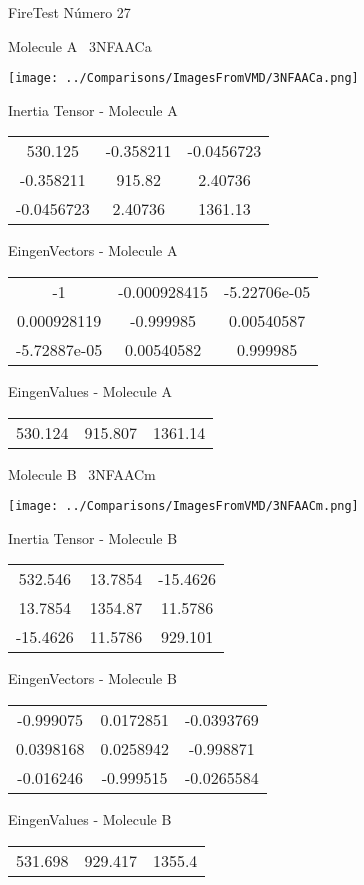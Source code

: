 \vtab[-3cm]
\begin{center}
{\large FireTest \tab Número 27}
\end{center}
\begin{multicols}{2}
\begin{center}

Molecule A \
3NFAACa

\texttt{[image: ../Comparisons/ImagesFromVMD/3NFAACa.png]}

Inertia Tensor - Molecule A \\
\begin{tabular}{|c c c|}
530.125	 & 	-0.358211	 & 	-0.0456723	 \\
-0.358211	 & 	915.82	 & 	2.40736	 \\
-0.0456723	 & 	2.40736	 & 	1361.13
\end{tabular}

\vtab
 EingenVectors - Molecule A     \\
\begin{tabular}{|c c c|}
-1	 & 	-0.000928415	 & 	-5.22706e-05	 \\
0.000928119	 & 	-0.999985	 & 	0.00540587	 \\
-5.72887e-05	 & 	0.00540582	 & 	0.999985
\end{tabular}

\vtab
 EingenValues - Molecule A     \\
\begin{tabular}{|c c c|}
530.124	 & 	915.807	 & 	1361.14	 \\
\end{tabular}
\columnbreak

Molecule B \
3NFAACm

\texttt{[image: ../Comparisons/ImagesFromVMD/3NFAACm.png]}

Inertia Tensor - Molecule B \\
\begin{tabular}{|c c c|}
532.546	 & 	13.7854	 & 	-15.4626	 \\
13.7854	 & 	1354.87	 & 	11.5786	 \\
-15.4626	 & 	11.5786	 & 	929.101
\end{tabular}

\vtab
 EingenVectors - Molecule B     \\
\begin{tabular}{|c c c|}
-0.999075	 & 	0.0172851	 & 	-0.0393769	 \\
0.0398168	 & 	0.0258942	 & 	-0.998871	 \\
-0.016246	 & 	-0.999515	 & 	-0.0265584
\end{tabular}

\vtab
 EingenValues - Molecule B     \\
\begin{tabular}{|c c c|}
531.698	 & 	929.417	 & 	1355.4	 \\
\end{tabular}

\end{center}
\end{multicols}

